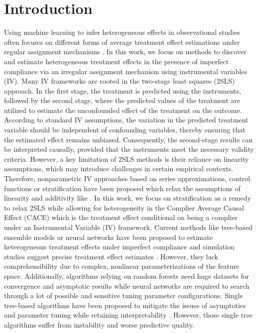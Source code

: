 \chapter{Introduction}

Using machine learning to infer heterogeneous effects in observational studies often focuses on different forms of average treatment effect estimations under regular assignment mechanisms \cite{athey_generalized_2019}. In this work, we focus on methods to discover and estimate heterogeneous treatment effects in the presence of imperfect compliance via an irregular assignment mechanism using instrumental variables (IV).
Many IV frameworks are rooted in the two-stage least squares (2SLS) approach. In the first stage, the treatment is predicted using the instruments, followed by the second stage, where the predicted values of the treatment are utilized to estimate the unconfounded effect of the treatment on the outcome. According to standard IV assumptions, the variation in the predicted treatment variable should be independent of confounding variables, thereby ensuring that the estimated effect remains unbiased. Consequently, the second-stage results can be interpreted causally, provided that the instruments meet the necessary validity criteria. However, a key limitation of 2SLS methods is their reliance on linearity assumptions, which may introduce challenges in certain empirical contexts. Therefore, nonparametric IV approaches based on series approximations, control functions or stratification have been proposed which relax the assumptions of linearity and additivity like \citep{newey_instrumental_2003, guo_control_2016}. 
In this work, we focus on stratification as a remedy to relax 2SLS while allowing for heterogeneity in the Complier Average Causal Effect (CACE) which is the treatment effect conditional on being a complier under an Instrumental Variable (IV) framework.
Current methods like tree-based ensemble models or neural networks have been proposed to estimate heterogeneous treatment effects under imperfect compliance and simulation studies suggest precise treatment effect estimates \citep{athey_generalized_2019, hartford_deep_2017}. 
However, they lack comprehensibility due to complex, nonlinear parameterizations of the feature space. Additionally, algorithms relying on random forests need huge datasets for convergence and asymptotic results while neural networks are required to search through a lot of possible and sensitive tuning parameter configurations. Single tree-based algorithms have been proposed to mitigate the issues of asymptotics and parameter tuning while retaining interpretability \citep{bargagli_stoffi_causal_2020, wang, johnson}. However, those single tree algorithms suffer from instability and worse predictive quality.  
